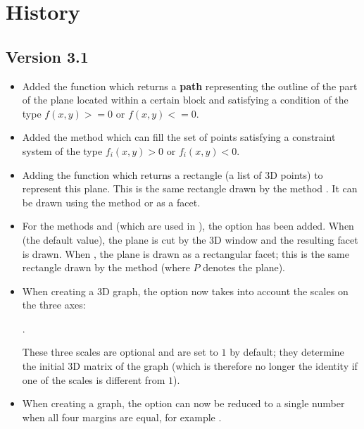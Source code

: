\section{History}

\subsection{Version 3.1}

\begin{itemize}
    \item Added the function  which returns a \textbf{path} representing the outline of the part of the plane located within a certain block and satisfying a condition of the type $f(x,y)>=0$ or $f(x,y)<=0$.
    
    \item Added the method  which can fill the set of points satisfying a constraint system of the type $f_i(x,y)>0$ or $f_i(x,y)<0$.
    
    \item Adding the function  which returns a rectangle (a list of 3D points) to represent this plane. This is the same rectangle drawn by the method . It can be drawn using the method  or as a facet.
    
    \item For the methods  and  (which are used in ), the  option has been added. When  (the default value), the plane is cut by the 3D window and the resulting facet is drawn. When , the plane is drawn as a rectangular facet; this is the same rectangle drawn by the method  (where $P$ denotes the plane).
    
    \item When creating a 3D graph, the  option now takes into account the scales on the three axes:\par
    \hfil{}.\hfil\par
    These three scales are optional and are set to $1$ by default; they determine the initial 3D matrix of the graph (which is therefore no longer the identity if one of the scales is different from $1$).
    
    \item When creating a graph, the  option can now be reduced to a single number when all four margins are equal, for example .
    

\end{itemize}
